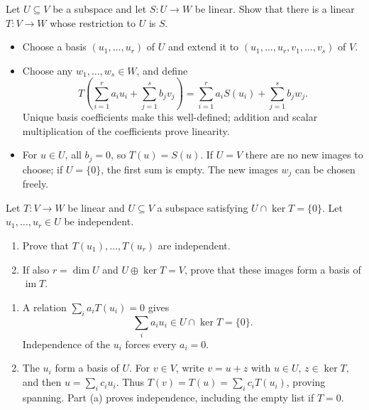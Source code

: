 \begin{problem}\label{ex:04:extension}
Let \(U\subseteq V\) be a subspace and let \(S:U\to W\) be linear.
Show that there is a linear \(T:V\to W\) whose restriction to \(U\) is \(S\).
\end{problem}
\begin{solution}
\begin{itemize}
\item Choose a basis \((u_1,\ldots,u_r)\) of \(U\) and extend it to
\((u_1,\ldots,u_r,v_1,\ldots,v_s)\) of \(V\).
\item Choose any \(w_1,\ldots,w_s\in W\), and define
\[
T\left(\sum_{i=1}^r a_iu_i+\sum_{j=1}^s b_jv_j\right)
=\sum_{i=1}^r a_iS(u_i)+\sum_{j=1}^s b_jw_j.
\]
Unique basis coefficients make this well-defined; addition and scalar
multiplication of the coefficients prove linearity.
\item For \(u\in U\), all \(b_j=0\), so \(T(u)=S(u)\).
If \(U=V\) there are no new images to choose; if \(U=\{0\}\), the
first sum is empty. The new images \(w_j\) can be chosen freely.
\end{itemize}
\end{solution}

\begin{problem}\label{ex:04:kernel-complement}
Let \(T:V\to W\) be linear and \(U\subseteq V\) a subspace satisfying
\(U\cap\ker T=\{0\}\). Let \(u_1,\ldots,u_r\in U\) be independent.
\begin{enumerate}
\item Prove that \(T(u_1),\ldots,T(u_r)\) are independent.
\item If also \(r=\dim U\) and \(U\oplus\ker T=V\), prove that these
images form a basis of \(\operatorname{im}T\).
\end{enumerate}
\end{problem}
\begin{solution}
\begin{enumerate}
\item A relation \(\sum_i a_iT(u_i)=0\) gives
\[
\sum_i a_iu_i\in U\cap\ker T=\{0\}.
\]
Independence of the \(u_i\) forces every \(a_i=0\).
\item The \(u_i\) form a basis of \(U\).
For \(v\in V\), write \(v=u+z\) with \(u\in U\), \(z\in\ker T\),
and then \(u=\sum_i c_iu_i\).
Thus \(T(v)=T(u)=\sum_i c_iT(u_i)\), proving spanning.
Part (a) proves independence, including the empty list if \(T=0\).
\end{enumerate}
\end{solution}

